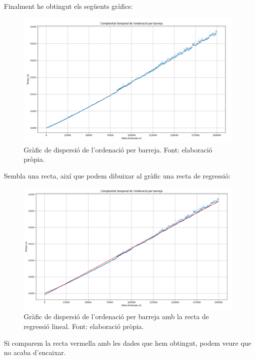 Finalment he obtingut els següents gràfics:
\begin{figure}[H]
    \centering
    \includegraphics[trim={0 0 0 45pt},clip,width=1\textwidth]{capitols/figures/mergescatter.png}
    \caption[Gràfic de dispersió de l'ordenació per barreja.]{Gràfic de dispersió de l'ordenació per barreja. Font: elaboració pròpia.}
    \label{fig:my_label}
\end{figure}
\vspace{-18pt}
Sembla una recta, així que podem dibuixar al gràfic una recta de regressió:
\begin{figure}[H]
    \centering
    \includegraphics[trim={0 0 0 38pt},clip,width=1\textwidth]{capitols/figures/mergescaterline.png}
    \caption[Gràfic de dispersió de l'ordenació per barreja amb la recta de regressió lineal.]{Gràfic de dispersió de l'ordenació per barreja amb la recta de regressió lineal. Font: elaboració pròpia.}
    \label{fig:my_label}
\end{figure}
Si comparem la recta vermella amb les dades que hem obtingut, podem veure que no acaba d'encaixar.

